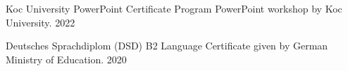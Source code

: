 
\begin{cvhonors}

  \cvhonor
    {Koc University PowerPoint Certificate Program}
    {PowerPoint workshop by Koc University.}
    {}
    {2022}

  \cvhonor
    {Deutsches Sprachdiplom (DSD) B2}
    {Language Certificate given by German Ministry of Education.}
    {}
    {2020}

\end{cvhonors}
